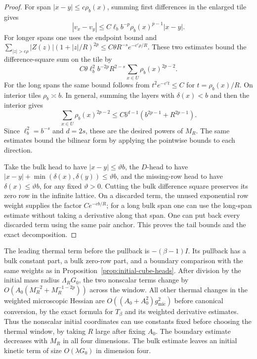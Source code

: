 \documentclass[11pt]{article}
\theoremstyle{definition}
\begin{document}
\begin{proof}
For span \(|x-y|\le c\rho_b(x)\), summing first differences in
the enlarged tile gives
\begin{equation}
 |v_x-v_y|\le C\ell_b b^{-p}\rho_b(x)^{p-1}|x-y|.
\end{equation}
For longer spans one uses the endpoint bound and
\(\sum_{|z|>c\rho}|Z(z)|(1+|z|/R)^{2p}
 \le C\theta R^{-s}e^{-c'\rho/R}\).
These two estimates bound the difference-square sum on the
tile by
\begin{equation}
 C\theta \ell_b^2 b^{-2p}R^{2-s}
              \sum_{x\in U}\rho_b(x)^{2p-2}.
\end{equation}
For the long spans the same bound follows from
\(t^2e^{-c't}\le C\) for \(t=\rho_b(x)/R\).
On interior tiles \(\rho_b\asymp b\). In general, summing the
layers with \(\delta(x)<b\) and then the interior gives
\begin{equation}
 \sum_{x\in U}\rho_b(x)^{2p-2}
       \le C b^{d-1}(b^{2p-1}+R^{2p-1}).
\end{equation}
Since \(\ell_b^2=b^{-s}\) and \(d=2s\), these are the desired
powers of \(M_R\). The same estimates bound the bilinear form
by applying the pointwise bounds to each direction.

Take the bulk head to have \(|x-y|\le\vartheta b\), the
\(D\)-head to have \(|x-y|+\min(\delta(x),\delta(y))\le\vartheta b\),
and the missing-row head to have \(\delta(x)\le\vartheta b\),
for any fixed \(\vartheta>0\). Cutting the bulk difference
square preserves its zero row in the infinite lattice. On a
discarded term, the unused exponential row weight supplies the
factor \(C e^{-c b/R}\); for a long bulk span one can use the
long-span estimate without taking a derivative along that
span. One can put back every discarded term using the same pair
anchor. This proves the tail bounds and the exact decomposition.
\end{proof}

The leading thermal term before the pullback is
\(- (\beta-1)I\). Its pullback has a bulk constant part,
a bulk zero-row part, and a boundary comparison with the same
weights as in Proposition~\ref{prop:initial-cube-heads}.
After division by the initial mass radius \(\Lambda_R G_0\),
the two nonscalar terms change by
\(O(A_0(M_R^{-2}+M_R^{-1-2p}))\) across the window.
All other thermal changes in the weighted microscopic
Hessian are \(O((A_0+A_0^2)g_{\mathrm{mic}}^2)\) before
canonical conversion, by the exact formula for \(T_\beta\)
and its weighted derivative estimates. Thus the nonscalar
initial coordinates can use constants fixed before choosing
the thermal window, by taking \(R\) large after fixing
\(A_0\). The boundary estimate decreases with \(M_R\) in all four dimensions. The bulk estimate leaves an initial
kinetic term of size \(O(\lambda G_0)\) in dimension four.
\end{document}
